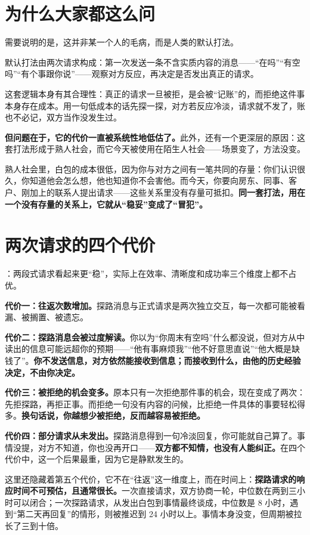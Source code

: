 \section{为什么大家都这么问}

需要说明的是，这并非某一个人的毛病，而是人类的默认打法。

默认打法由两次请求构成：第一次发送一条不含实质内容的消息——“在吗”“有空吗”“有个事跟你说”——观察对方反应，再决定是否发出真正的请求。

这套逻辑本身有其合理性：真正的请求一旦被拒，是会被“记账”的，而拒绝这件事本身存在成本。用一句低成本的话先探一探，对方若反应冷淡，请求就不发了，账也不必记，双方当作没发生过。

\textbf{但问题在于，它的代价一直被系统性地低估了。}此外，还有一个更深层的原因：这套打法形成于熟人社会，而它今天被使用在陌生人社会——场景变了，方法没变。

熟人社会里，白包的成本很低，因为你与对方之间有一笔共同的存量：你们认识很久，你知道他会怎么想，他也知道你不会害他。而今天，你要向房东、同事、客户、刚加上的联系人提出请求——这些关系里没有存量可抵扣。\textbf{同一套打法，用在一个没有存量的关系上，它就从“稳妥”变成了“冒犯”。}

\section{两次请求的四个代价}

：两段式请求看起来更“稳”，实际上在效率、清晰度和成功率三个维度上都不占优。

\textbf{代价一：往返次数增加。}探路消息与正式请求是两次独立交互，每一次都可能被看漏、被搁置、被遗忘。

\textbf{代价二：探路消息会被过度解读。}你以为“你周末有空吗”什么都没说，但对方从中读出的信息可能远超你的预期——“他有事麻烦我”“他不好意思直说”“他大概是缺钱了”。\textbf{你不发送信息，对方依然能接收到信息；而接收到什么，由他的历史经验决定，不由你决定。}

\textbf{代价三：被拒绝的机会变多。}原本只有一次拒绝那件事的机会，现在变成了两次：先拒探路，再拒正事。而拒绝一句没有内容的问候，比拒绝一件具体的事要轻松得多。\textbf{换句话说，你越想少被拒绝，反而越容易被拒绝。}

\textbf{代价四：部分请求从未发出。}探路消息得到一句冷淡回复，你可能就自己算了。事情没提，对方不知道，你也没再开口——\textbf{双方都不知情，也没有人能纠正。}在四个代价中，这一个后果最重，因为它是静默发生的。

这里还隐藏着第五个代价，它不在“往返”这一维度上，而在时间上：\textbf{探路请求的响应时间不可预估，且通常很长。}一次直接请求，双方协商一轮，中位数在两到三小时可以闭合；一次探路请求，从发出白包到事情最终谈成，中位数是 8 小时，遇到“第二天再回复”的情形，则被推迟到 24 小时以上。事情本身没变，但周期被拉长了三到十倍。

